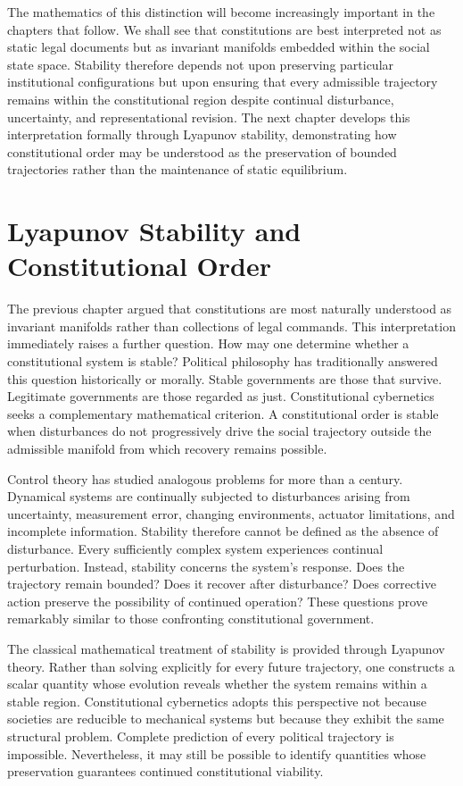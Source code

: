 \documentclass[12pt,a4paper]{article}
\begin{document}
The mathematics of this distinction will become increasingly important in the chapters that follow. We shall see that constitutions are best interpreted not as static legal documents but as invariant manifolds embedded within the social state space. Stability therefore depends not upon preserving particular institutional configurations but upon ensuring that every admissible trajectory remains within the constitutional region despite continual disturbance, uncertainty, and representational revision. The next chapter develops this interpretation formally through Lyapunov stability, demonstrating how constitutional order may be understood as the preservation of bounded trajectories rather than the maintenance of static equilibrium.

\section{Lyapunov Stability and Constitutional Order}

The previous chapter argued that constitutions are most naturally understood as invariant manifolds rather than collections of legal commands. This interpretation immediately raises a further question. How may one determine whether a constitutional system is stable? Political philosophy has traditionally answered this question historically or morally. Stable governments are those that survive. Legitimate governments are those regarded as just. Constitutional cybernetics seeks a complementary mathematical criterion. A constitutional order is stable when disturbances do not progressively drive the social trajectory outside the admissible manifold from which recovery remains possible.

Control theory has studied analogous problems for more than a century. Dynamical systems are continually subjected to disturbances arising from uncertainty, measurement error, changing environments, actuator limitations, and incomplete information. Stability therefore cannot be defined as the absence of disturbance. Every sufficiently complex system experiences continual perturbation. Instead, stability concerns the system's response. Does the trajectory remain bounded? Does it recover after disturbance? Does corrective action preserve the possibility of continued operation? These questions prove remarkably similar to those confronting constitutional government.

The classical mathematical treatment of stability is provided through Lyapunov theory. Rather than solving explicitly for every future trajectory, one constructs a scalar quantity whose evolution reveals whether the system remains within a stable region. Constitutional cybernetics adopts this perspective not because societies are reducible to mechanical systems but because they exhibit the same structural problem. Complete prediction of every political trajectory is impossible. Nevertheless, it may still be possible to identify quantities whose preservation guarantees continued constitutional viability.
\end{document}
